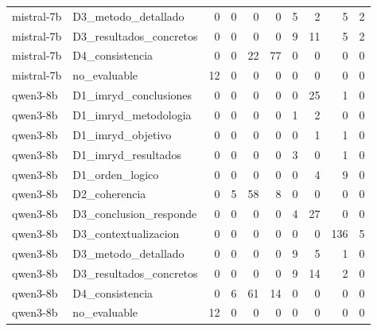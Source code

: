 \begin{table}
\begin{tabular}{llrrrrrrrr}
mistral-7b & D3\_metodo\_detallado & 0 & 0 & 0 & 0 & 5 & 2 & 5 & 2 \\
mistral-7b & D3\_resultados\_concretos & 0 & 0 & 0 & 0 & 9 & 11 & 5 & 2 \\
mistral-7b & D4\_consistencia & 0 & 0 & 22 & 77 & 0 & 0 & 0 & 0 \\
mistral-7b & no\_evaluable & 12 & 0 & 0 & 0 & 0 & 0 & 0 & 0 \\
qwen3-8b & D1\_imryd\_conclusiones & 0 & 0 & 0 & 0 & 0 & 25 & 1 & 0 \\
qwen3-8b & D1\_imryd\_metodologia & 0 & 0 & 0 & 0 & 1 & 2 & 0 & 0 \\
qwen3-8b & D1\_imryd\_objetivo & 0 & 0 & 0 & 0 & 0 & 1 & 1 & 0 \\
qwen3-8b & D1\_imryd\_resultados & 0 & 0 & 0 & 0 & 3 & 0 & 1 & 0 \\
qwen3-8b & D1\_orden\_logico & 0 & 0 & 0 & 0 & 0 & 4 & 9 & 0 \\
qwen3-8b & D2\_coherencia & 0 & 5 & 58 & 8 & 0 & 0 & 0 & 0 \\
qwen3-8b & D3\_conclusion\_responde & 0 & 0 & 0 & 0 & 4 & 27 & 0 & 0 \\
qwen3-8b & D3\_contextualizacion & 0 & 0 & 0 & 0 & 0 & 0 & 136 & 5 \\
qwen3-8b & D3\_metodo\_detallado & 0 & 0 & 0 & 0 & 9 & 5 & 1 & 0 \\
qwen3-8b & D3\_resultados\_concretos & 0 & 0 & 0 & 0 & 9 & 14 & 2 & 0 \\
qwen3-8b & D4\_consistencia & 0 & 6 & 61 & 14 & 0 & 0 & 0 & 0 \\
qwen3-8b & no\_evaluable & 12 & 0 & 0 & 0 & 0 & 0 & 0 & 0 \\
\bottomrule
\end{tabular}
\end{table}
